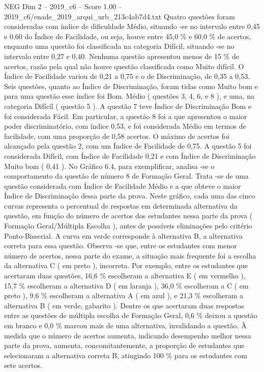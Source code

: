 \begin{textsample}{NEG Dim 2 – 2019\_c6 – Score 1.00 – 2019\_c6/enade\_2019\_arqui\_urb\_213c4ab7d4.txt}
Quatro questões foram consideradas com índice de dificuldade Médio, situando -se no intervalo entre 0,45 e 0,60 do Índice de Facilidade, ou seja, houve entre 45,0 \% e 60,0 \% de acertos, enquanto uma questão foi classificada na categoria Difícil, situando -se no intervalo entre 0,27 e 0,40.
Nenhuma questão apresentou menos de 15 \% de acertos, razão pela qual não houve questão classificada como Muito difícil.
O Índice de Facilidade variou de 0,21 a 0,75 e o de Discriminação, de 0,35 a 0,53.
Seis questões, quanto ao Índice de Discriminação, foram tidas como Muito bom e para uma questão esse índice foi Bom.
Médio ( questões 3, 4, 6, e 8 ), e uma, na categoria Difícil ( questão 5 ).
A questão 7 teve Índice de Discriminação Bom e foi considerada Fácil.
Em particular, a questão 8 foi a que apresentou o maior poder discriminatório, com índice 0,53, e foi considerada Médio em termos de facilidade, com uma proporção de 0,58 acertos.
O máximo de acertos foi alcançado pela questão 2, com um Índice de Facilidade de 0,75.
A questão 5 foi considerada Difícil, com Índice de Facilidade 0,21 e com Índice de Discriminação Muito bom ( 0,41 ).
No Gráfico 6.4, para exemplificar, analisa -se o comportamento da questão de número 8 de Formação Geral.
Trata -se de uma questão considerada com Índice de Facilidade Médio e a que obteve o maior Índice de Discriminação dessa parte da prova.
Neste gráfico, cada uma das cinco curvas representa o percentual de respostas em determinada alternativa da questão, em função do número de acertos dos estudantes nessa parte da prova ( Formação Geral/Múltipla Escolha ), antes de possíveis eliminações pelo critério Ponto-Bisserial.
A curva em verde corresponde à alternativa B, a alternativa correta para essa questão.
Observa -se que, entre os estudantes com menor número de acertos, nessa parte do exame, a situação mais frequente foi a escolha da alternativa C ( em preto ), incorreta.
Por exemplo, entre os estudantes que acertaram duas questões, 16,6 \% escolheram a alternativa E ( em vermelho ), 15,7 \% escolheram a alternativa D ( em laranja ), 36,0 \% escolheram a C ( em preto ), 9,6 \% escolheram a alternativa A ( em azul ), e 21,3 \% escolheram a alternativa B ( em verde, gabarito ).
Dentre os que acertaram duas respostas entre as questões de múltipla escolha de Formação Geral, 0,6 \% deixou a questão em branco e 0,0 \% marcou mais de uma alternativa, invalidando a questão.
À medida que o número de acertos aumenta, indicando desempenho melhor nessa parte da prova, aumenta, concomitantemente, a proporção de estudantes que selecionaram a alternativa correta B, atingindo 100 \% para os estudantes com sete acertos.

\end{textsample}
